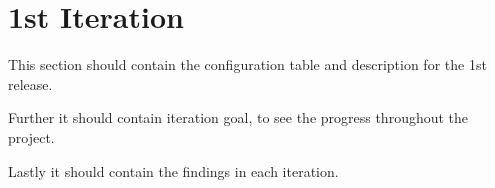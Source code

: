 \section{1st Iteration}
This section should contain the configuration table and description for the 1st release.

Further it should contain iteration goal, to see the progress throughout the project.

Lastly it should contain the findings in each iteration.